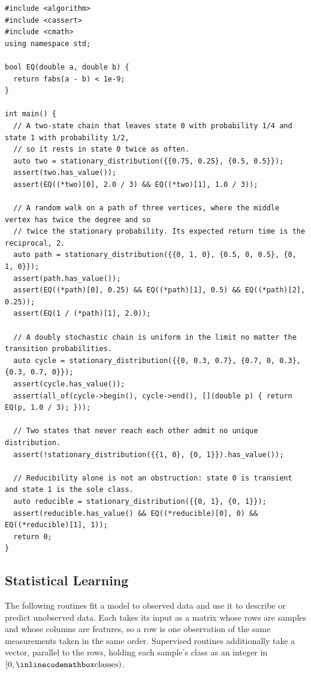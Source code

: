 \begin{lstlisting}[style=cpp]
#include <algorithm>
#include <cassert>
#include <cmath>
using namespace std;

bool EQ(double a, double b) {
  return fabs(a - b) < 1e-9;
}

int main() {
  // A two-state chain that leaves state 0 with probability 1/4 and state 1 with probability 1/2,
  // so it rests in state 0 twice as often.
  auto two = stationary_distribution({{0.75, 0.25}, {0.5, 0.5}});
  assert(two.has_value());
  assert(EQ((*two)[0], 2.0 / 3) && EQ((*two)[1], 1.0 / 3));

  // A random walk on a path of three vertices, where the middle vertex has twice the degree and so
  // twice the stationary probability. Its expected return time is the reciprocal, 2.
  auto path = stationary_distribution({{0, 1, 0}, {0.5, 0, 0.5}, {0, 1, 0}});
  assert(path.has_value());
  assert(EQ((*path)[0], 0.25) && EQ((*path)[1], 0.5) && EQ((*path)[2], 0.25));
  assert(EQ(1 / (*path)[1], 2.0));

  // A doubly stochastic chain is uniform in the limit no matter the transition probabilities.
  auto cycle = stationary_distribution({{0, 0.3, 0.7}, {0.7, 0, 0.3}, {0.3, 0.7, 0}});
  assert(cycle.has_value());
  assert(all_of(cycle->begin(), cycle->end(), [](double p) { return EQ(p, 1.0 / 3); }));

  // Two states that never reach each other admit no unique distribution.
  assert(!stationary_distribution({{1, 0}, {0, 1}}).has_value());

  // Reducibility alone is not an obstruction: state 0 is transient and state 1 is the sole class.
  auto reducible = stationary_distribution({{0, 1}, {0, 1}});
  assert(reducible.has_value() && EQ((*reducible)[0], 0) && EQ((*reducible)[1], 1));
  return 0;
}
\end{lstlisting}
\subsection{Statistical Learning}
\label{sec:6.7.5}
The following routines fit a model to observed data and use it to describe or predict unobserved data. Each takes its input as a  matrix whose rows are samples and whose columns are features, so a row is one observation of the same measurements taken in the same order. Supervised routines additionally take a  vector, parallel to the rows, holding each sample's class as an integer in $[0, {\inlinecodemath{classes}})$.

